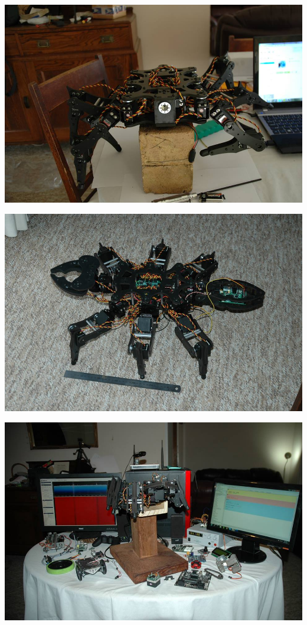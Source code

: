     			\centerline{\includegraphics[width=\linewidth]{images/apod_build4}}
    			\centerline{\includegraphics[width=\linewidth]{images/apod_build5}}
    			\centerline{\includegraphics[width=\linewidth]{images/apod_build6}}
    			
